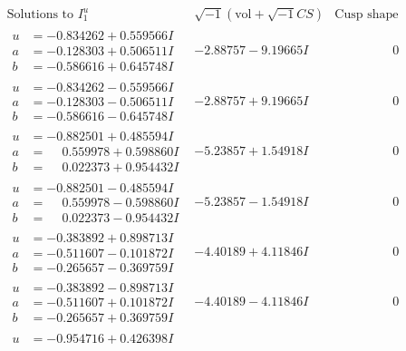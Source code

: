 \documentclass[1p]{elsarticle_modified}
\theoremstyle{definition}
\newcommand{\I}{\sqrt{-1}}
\begin{document}
$$\begin{array}{c|c|c}  
\text{Solutions to }I^u_{1}& \I (\text{vol} + \sqrt{-1}CS) & \text{Cusp shape}\\
 \hline 
\begin{aligned}
u &= -0.834262 + 0.559566 I \\
a &= -0.128303 + 0.506511 I \\
b &= -0.586616 + 0.645748 I\end{aligned}
 & -2.88757 - 9.19665 I & \phantom{-0.000000 } 0 \\ \hline\begin{aligned}
u &= -0.834262 - 0.559566 I \\
a &= -0.128303 - 0.506511 I \\
b &= -0.586616 - 0.645748 I\end{aligned}
 & -2.88757 + 9.19665 I & \phantom{-0.000000 } 0 \\ \hline\begin{aligned}
u &= -0.882501 + 0.485594 I \\
a &= \phantom{-}0.559978 + 0.598860 I \\
b &= \phantom{-}0.022373 + 0.954432 I\end{aligned}
 & -5.23857 + 1.54918 I & \phantom{-0.000000 } 0 \\ \hline\begin{aligned}
u &= -0.882501 - 0.485594 I \\
a &= \phantom{-}0.559978 - 0.598860 I \\
b &= \phantom{-}0.022373 - 0.954432 I\end{aligned}
 & -5.23857 - 1.54918 I & \phantom{-0.000000 } 0 \\ \hline\begin{aligned}
u &= -0.383892 + 0.898713 I \\
a &= -0.511607 - 0.101872 I \\
b &= -0.265657 - 0.369759 I\end{aligned}
 & -4.40189 + 4.11846 I & \phantom{-0.000000 } 0 \\ \hline\begin{aligned}
u &= -0.383892 - 0.898713 I \\
a &= -0.511607 + 0.101872 I \\
b &= -0.265657 + 0.369759 I\end{aligned}
 & -4.40189 - 4.11846 I & \phantom{-0.000000 } 0 \\ \hline\begin{aligned}
u &= -0.954716 + 0.426398 I \\

\end{aligned}
\end{array}$$
\end{document}
